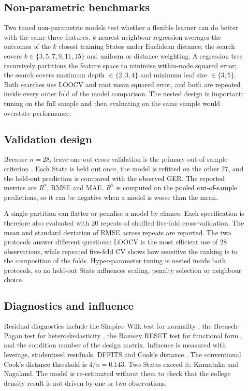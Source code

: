 \subsection{Non-parametric benchmarks}

Two tuned non-parametric models test whether a flexible learner can do better with the same three features. \(k\)-nearest-neighbour regression averages the outcomes of the \(k\) closest training States under Euclidean distance; the search covers \(k \in \{3,5,7,9,11,15\}\) and uniform or distance weighting. A regression tree recursively partitions the feature space to minimise within-node squared error; the search covers maximum depth \(\in \{2,3,4\}\) and minimum leaf size \(\in \{3,5\}\). Both searches use LOOCV and root mean squared error, and both are repeated inside every outer fold of the model comparison. The nested design is important: tuning on the full sample and then evaluating on the same sample would overstate performance.

\subsection{Validation design}

Because \(n = 28\), leave-one-out cross-validation is the primary out-of-sample criterion \cite{stone1974}. Each State is held out once, the model is refitted on the other 27, and the held-out prediction is compared with the observed GER. The reported metrics are \(R^2\), RMSE and MAE. \(R^2\) is computed on the pooled out-of-sample predictions, so it can be negative when a model is worse than the mean.

A single partition can flatter or penalise a model by chance. Each specification is therefore also evaluated with 20 repeats of shuffled five-fold cross-validation. The mean and standard deviation of RMSE across repeats are reported. The two protocols answer different questions: LOOCV is the most efficient use of 28 observations, while repeated five-fold CV shows how sensitive the ranking is to the composition of the folds. Hyper-parameter tuning is nested inside both protocols, so no held-out State influences scaling, penalty selection or neighbour choice.

\subsection{Diagnostics and influence}

Residual diagnostics include the Shapiro--Wilk test for normality \cite{shapiro1965}, the Breusch--Pagan test for heteroskedasticity \cite{breusch1979}, the Ramsey RESET test for functional form \cite{ramsey1969}, and the condition number of the design matrix. Influence is measured with leverage, studentised residuals, DFFITS and Cook's distance \cite{cook1977}. The conventional Cook's distance threshold is \(4/n = 0.143\). Two States exceed it: Karnataka and Nagaland. The model is re-estimated without them to check that the college density result is not driven by one or two observations.


